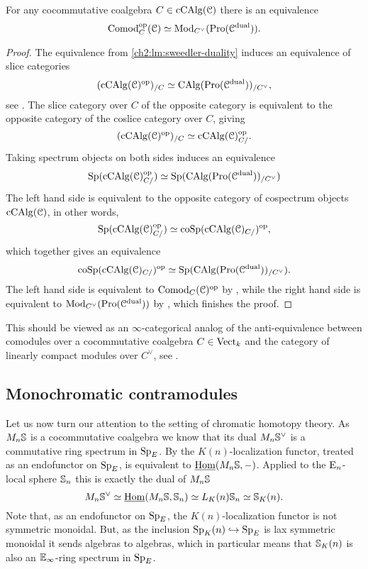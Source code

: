 \begin{proposition}
    \label{ch2:prop:comodules-and-promodules}
    For any cocommutative coalgebra $C\in \cCAlg(\C)$ there is an equivalence 
    \[\Comod\op_C(\C)\simeq \Mod_{C^\vee}(\Pro(\C\dual)).\]  
\end{proposition}
\begin{proof}
    The equivalence from \cref{ch2:lm:sweedler-duality} induces an equivalence of slice categories 
    \[(\cCAlg(\C)\op)_{/C}\simeq \CAlg(\Pro(\C\dual))_{/C^\vee},\]
    see \cite[5.2.5.1]{lurie_09}. The slice category over $C$ of the opposite category is equivalent to the opposite category of the coslice category over $C$, giving 
    \[(\cCAlg(\C)\op)_{/C} \simeq \cCAlg(\C)\op_{C/}.\]
    Taking spectrum objects on both sides induces an equivalence
    \[\Sp(\cCAlg(\C)_{C/}\op)\simeq \Sp(\CAlg(\Pro(\C\dual))_{/C^\vee})\]
    The left hand side is equivalent to the opposite category of cospectrum objects $\cCAlg(\C)$, in other words, 
    \[\Sp(\cCAlg(\C)_{C/}\op)\simeq \coSp(\cCAlg(\C)_{C/})\op,\]
    which together gives an equivalence
    \[\coSp(\cCAlg(\C)_{C/})\op \simeq \Sp(\CAlg(\Pro(\C\dual))_{/C^\vee}).\]
    The left hand side is equivalent to $\Comod_C(\C)\op$ by \cite[1.0.3]{chen_2024}, while the right hand side is equivalent to $\Mod_{C^\vee}(\Pro(\C\dual))$ by \cite[7.3.4.13]{Lurie_HA}, which finishes the proof.  
\end{proof}

\begin{remark}
    This should be viewed as an $\infty$-categorical analog of the anti-equivalence between comodules over a cocommutative coalgebra $C\in \Vect_k$ and the category of linearly compact modules over $C^\vee$, see \cite[II.29]{lefschetz_1942}. 
\end{remark}

\subsection{Monochromatic contramodules}

Let us now turn our attention to the setting of chromatic homotopy theory. As $M_n\S$ is a cocommutative coalgebra we know that its dual $M_n\S^\vee$ is a commutative ring spectrum in $\SpE$. By \cite[2.21(4)]{barthel-heard-valenzuela_2018} the $K(n)$-localization functor, treated as an endofunctor on $\SpE$, is equivalent to $\iHom(M_n\S,-)$. Applied to the $\En$-local sphere $\S_n$ this is exactly the dual of $M_n\S$
\[M_n \S^\vee \simeq \iHom(M_n\S, \S_n)\simeq L_\Kn \S_n \simeq \S_\Kn.\]
Note that, as an endofunctor on $\SpE$, the $K(n)$-localization functor is not symmetric monoidal. But, as the inclusion $\Sp_\Kn\hookrightarrow \SpE$ is lax symmetric monoidal it sends algebras to algebras, which in particular means that $\S_\Kn$ is also an $\E_\infty$-ring spectrum in $\SpE$. 


